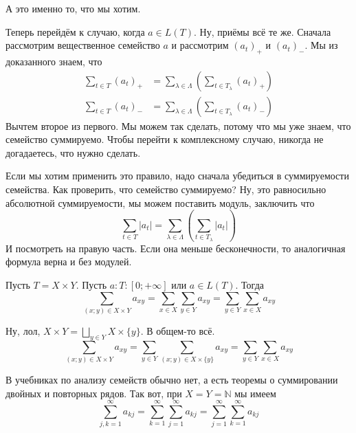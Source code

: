 \documentclass{article}
\begin{document}
\begin{itemize}
\begin{Proof}
\begin{itemize}
$$                $$
                А это именно то, что мы хотим.
            \end{itemize}
            Теперь перейдём к случаю, когда $a\in L(T)$. Ну, приёмы всё те же. Сначала рассмотрим вещественное семейство $a$ и рассмотрим $(a_t)_+$ и $(a_t)_-$. Мы из доказанного знаем, что
            \[
            \begin{split}
                \sum\limits_{t\in T}(a_t)_+&=\sum\limits_{\lambda\in\Lambda}\left(\sum\limits_{t\in T_\lambda}(a_t)_+\right)\\
                \sum\limits_{t\in T}(a_t)_-&=\sum\limits_{\lambda\in\Lambda}\left(\sum\limits_{t\in T_\lambda}(a_t)_-\right)
            \end{split}
            \]
            Вычтем второе из первого. Мы можем так сделать, потому что мы уже знаем, что семейство суммируемо. Чтобы перейти к комплексному случаю, никогда не догадаетесь, что нужно сделать.
        \end{Proof}
        \begin{Comment}
            Если мы хотим применить это правило, надо сначала убедиться в суммируемости семейства. Как проверить, что семейство суммируемо? Ну, это равносильно абсолютной суммируемости, мы можем поставить модуль, заключить что
            $$
            \sum\limits_{t\in T}|a_t|=\sum\limits_{\lambda\in\Lambda}\left(\sum\limits_{t\in T_\lambda}|a_t|\right)
            $$
            И посмотреть на правую часть. Если она меньше бесконечности, то аналогичная формула верна и без модулей.
        \end{Comment}
        \thm Пусть $T=X\times Y$. Пусть $a\colon T\colon[0;+\infty]$ или $a\in L(T)$. Тогда
        $$
        \sum\limits_{(x;y)\in X\times Y}a_{xy}=\sum\limits_{x\in X}\sum\limits_{y\in Y}a_{xy}=\sum\limits_{y\in Y}\sum\limits_{x\in X}a_{xy}
        $$
        \begin{Proof}
            Ну, лол, $X\times Y=\bigsqcup\limits_{y\in Y}X\times\{y\}$. В общем-то всё.
            $$
            \sum\limits_{(x;y)\in X\times Y}a_{xy}=\sum\limits_{y\in Y}\sum\limits_{(x;y)\in X\times\{y\}}a_{xy}=\sum\limits_{y\in Y}\sum\limits_{x\in X}a_{xy}
            $$
        \end{Proof}
        \begin{Comment}
            В учебниках по анализу семейств обычно нет, а есть теоремы о суммировании двойных и повторных рядов. Так вот, при $X=Y=\mathbb N$ мы имеем
            $$
            \sum\limits_{j,k=1}^\infty a_{kj}=\sum\limits_{k=1}^\infty\sum\limits_{j=1}^\infty a_{kj}=\sum\limits_{j=1}^\infty\sum\limits_{k=1}^\infty a_{kj}
$$
\end{Comment}
\end{itemize}
\end{document}
